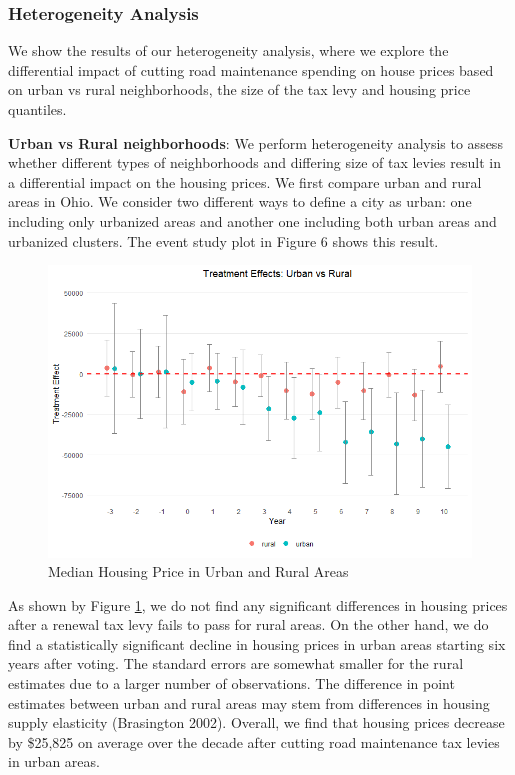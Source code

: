 \subsubsection{Heterogeneity Analysis} We show the results of our heterogeneity analysis, where we explore the differential impact of cutting road maintenance spending on house prices based on urban vs rural neighborhoods, the size of the tax levy and housing price quantiles.

\vskip 0.5cm

\textbf{Urban vs Rural neighborhoods}: We perform heterogeneity analysis to assess whether different types of neighborhoods and differing size of tax levies result in a differential impact on the housing prices. We first compare urban and rural areas in Ohio. We consider two different ways to define a city as urban:  one including only urbanized areas and another one including both urban areas and urbanized clusters. The event study plot in Figure 6 shows this result. 

\begin{figure}[htbp]
    \centering
    \includegraphics[width=\textwidth,keepaspectratio]{images/tes_covs_ua_clean.png}    
    \caption{Median Housing Price in Urban and Rural Areas}
    \label{fig:tes_covs_ua}
\end{figure}

As shown by Figure \ref{fig:tes_covs_ua}, we do not find any significant differences in housing prices after a renewal tax levy fails to pass for rural areas. On the other hand, we do find a statistically significant decline in housing prices in urban areas starting six years after voting. The standard errors are somewhat smaller for the rural estimates due to a larger number of observations. The difference in point estimates between urban and rural areas may stem from differences in housing supply elasticity (Brasington 2002). Overall, we find that housing prices decrease by \$25,825 on average over the decade after cutting road maintenance tax levies in urban areas. 

